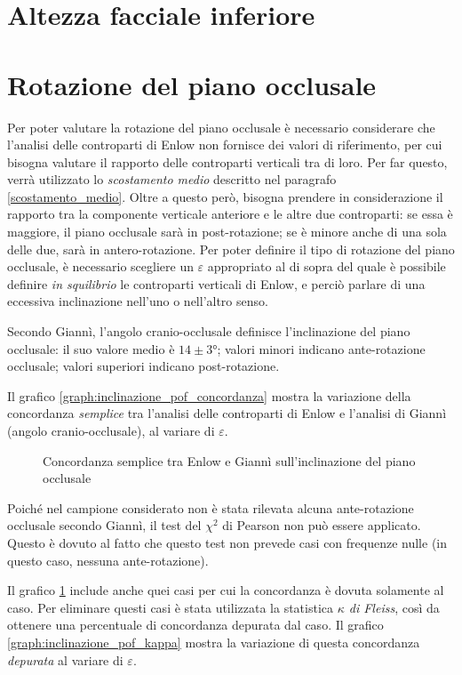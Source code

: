 \section{Altezza facciale inferiore}

\section{Rotazione del piano occlusale}
Per poter valutare la rotazione del piano occlusale è necessario considerare che l'analisi delle controparti di Enlow non fornisce dei valori di riferimento, per cui bisogna valutare il rapporto delle controparti verticali tra di loro. Per far questo, verrà utilizzato lo \emph{scostamento medio} descritto nel paragrafo \vref{scostamento_medio}. Oltre a questo però, bisogna prendere in considerazione il rapporto tra la componente verticale anteriore e le altre due controparti: se essa è maggiore, il piano occlusale sarà in post-rotazione; se è minore anche di una sola delle due, sarà in antero-rotazione. Per poter definire il tipo di rotazione del piano occlusale, è necessario scegliere un $\varepsilon$ appropriato al di sopra del quale è possibile definire \emph{in squilibrio} le controparti verticali di Enlow, e perciò parlare di una eccessiva inclinazione nell'uno o nell'altro senso.

Secondo Giannì, l'angolo cranio-occlusale definisce l'inclinazione del piano occlusale: il suo valore medio è $14 \pm 3°$; valori minori indicano ante-rotazione occlusale; valori superiori indicano post-rotazione.

Il grafico \vref{graph:inclinazione_pof_concordanza} mostra la variazione della concordanza \emph{semplice} tra l'analisi delle controparti di Enlow e l'analisi di Giannì (angolo cranio-occlusale), al variare di $\varepsilon$.

\begin{figure}[ht!]
\centering

\caption{Concordanza semplice tra Enlow e Giannì sull'inclinazione del piano occlusale}
\label{graph:inclinazione_pof_concordanza}
\end{figure}

Poiché nel campione considerato non è stata rilevata alcuna ante-rotazione occlusale secondo Giannì, il test del $\chi^2$ di Pearson non può essere applicato. Questo è dovuto al fatto che questo test non prevede casi con frequenze nulle (in questo caso, nessuna ante-rotazione).

Il grafico \ref{graph:inclinazione_pof_concordanza} include anche quei casi per cui la concordanza è dovuta solamente al caso. Per eliminare questi casi è stata utilizzata la statistica \emph{$\kappa$ di Fleiss}, così da ottenere una percentuale di concordanza depurata dal caso. Il grafico \vref{graph:inclinazione_pof_kappa} mostra la variazione di questa concordanza \emph{depurata} al variare di $\varepsilon$.


